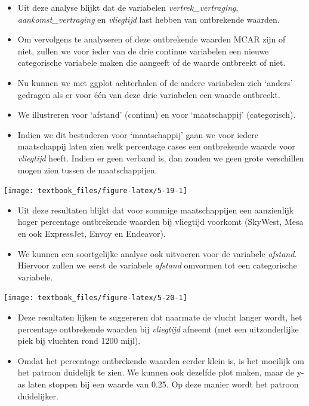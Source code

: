 \documentclass[]{tufte-book}
\providecommand{\tightlist}{%
  \setlength{\itemsep}{0pt}\setlength{\parskip}{0pt}}
\begin{document}
\begin{itemize}
\item
  Uit deze analyse blijkt dat de variabelen \emph{vertrek\_vertraging}, \emph{aankomst\_vertraging} en \emph{vliegtijd} last hebben van ontbrekende waarden.
\item
  Om vervolgens te analyseren of deze ontbrekende waarden MCAR zijn of niet, zullen we voor ieder van de drie continue variabelen een nieuwe categorische variabele maken die aangeeft of de waarde ontbreekt of niet.
\item
  Nu kunnen we met ggplot achterhalen of de andere variabelen zich `anders' gedragen als er voor één van deze drie variabelen een waarde ontbreekt.
\item
  We illustreren voor `afstand' (continu) en voor `maatschappij' (categorisch).
\item
  Indien we dit bestuderen voor `maatschappij' gaan we voor iedere maatschappij laten zien welk percentage cases een ontbrekende waarde voor \emph{vliegtijd} heeft. Indien er geen verband is, dan zouden we geen grote verschillen mogen zien tussen de maatschappijen.
\end{itemize}

\texttt{[image: textbook\_files/figure-latex/5-19-1]}

\begin{itemize}
\tightlist
\item
  Uit deze resultaten blijkt dat voor sommige maatschappijen een aanzienlijk hoger percentage ontbrekende waarden bij vliegtijd voorkomt (SkyWest, Mesa en ook ExpressJet, Envoy en Endeavor).
\item
  We kunnen een soortgelijke analyse ook uitvoeren voor de variabele \emph{afstand}. Hiervoor zullen we eerst de variabele \emph{afstand} omvormen tot een categorische variabele.
\end{itemize}

\texttt{[image: textbook\_files/figure-latex/5-20-1]}

\begin{itemize}
\tightlist
\item
  Deze resultaten lijken te suggereren dat naarmate de vlucht langer wordt, het percentage ontbrekende waarden bij \emph{vliegtijd} afneemt (met een uitzonderlijke piek bij vluchten rond 1200 mijl).
\item
  Omdat het percentage ontbrekende waarden eerder klein is, is het moeilijk om het patroon duidelijk te zien. We kunnen ook dezelfde plot maken, maar de y-as laten stoppen bij een waarde van 0.25. Op deze manier wordt het patroon duidelijker.
\end{itemize}
\end{document}
